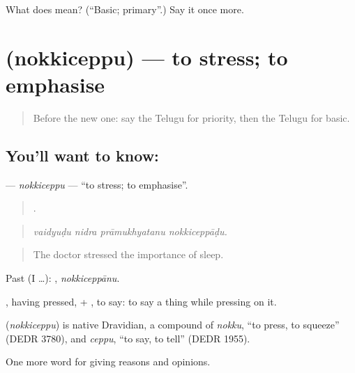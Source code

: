 \begin{tcolorbox}[breakable,colback=teal!4,colframe=teal!35!black,title={Before you move on}]
What does  mean? (\textquotedblleft{}Basic; primary\textquotedblright{}.) Say it once more.
\end{tcolorbox}
\section[\texorpdfstring{\te{నొక్కిచెప్పు} (nokkiceppu)}{నొక్కిచెప్పు (nokkiceppu)}]{ (nokkiceppu) — to stress; to emphasise}

\label{lesson:TE-C391-nokkiceppu}



\begin{quote}
Before the new one: say the Telugu for priority, then the Telugu for basic.
\end{quote}

\subsection*{You'll want to know: }
\textbf{} — \emph{nokkiceppu} — \textquotedblleft{}to stress; to emphasise\textquotedblright{}.

\begin{quote}
   .
\end{quote}

\begin{quote}
\emph{vaidyuḍu nidra prāmukhyatanu nokkiceppāḍu.}
\end{quote}

\begin{quote}
The doctor stressed the importance of sleep.
\end{quote}

Past (I …): , \emph{nokkiceppānu}.

, having pressed, + , to say: to say a thing while pressing on it.

\begin{cousinweb}
\textbf{} (\emph{nokkiceppu}) is native Dravidian, a compound of \emph{nokku}, \textquotedblleft{}to press, to squeeze\textquotedblright{} (DEDR 3780), and \emph{ceppu}, \textquotedblleft{}to say, to tell\textquotedblright{} (DEDR 1955).
\end{cousinweb}

\begin{grammarlens}[title={What you've built}]
One more word for giving reasons and opinions.
\end{grammarlens}

